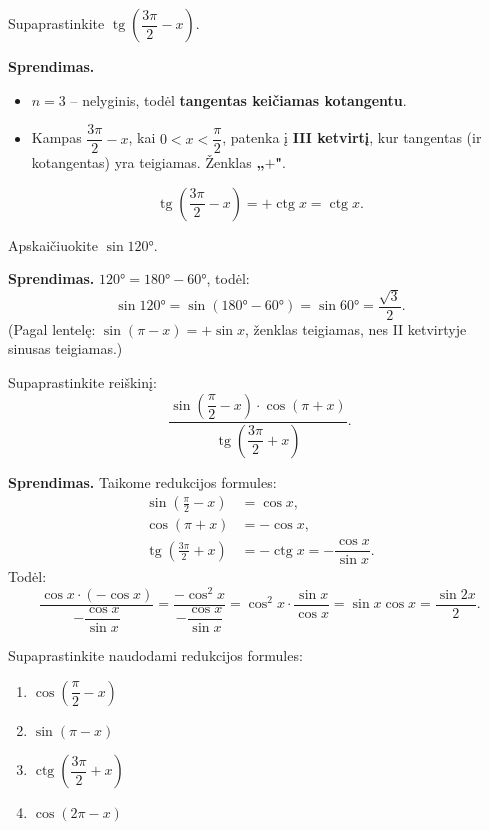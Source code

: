 \begin{example}
  Supaprastinkite $\operatorname{tg}\!\left(\dfrac{3\pi}{2} - x\right)$.

  \textbf{Sprendimas.}
  \begin{itemize}
    \item $n = 3$ -- nelyginis, todėl \textbf{tangentas keičiamas kotangentu}.
    \item Kampas $\dfrac{3\pi}{2} - x$, kai $0<x<\dfrac{\pi}{2}$, patenka į
          \textbf{III ketvirtį}, kur tangentas (ir kotangentas) yra teigiamas.
          Ženklas \textbf{„$+$"}.
  \end{itemize}
  \[
    \operatorname{tg}\!\left(\frac{3\pi}{2}-x\right) = +\operatorname{ctg} x
    = \operatorname{ctg} x.
  \]
\end{example}

\begin{example}
  Apskaičiuokite $\sin 120°$.

  \textbf{Sprendimas.} $120° = 180° - 60°$, todėl:
  \[
    \sin 120° = \sin(180°-60°) = \sin 60° = \frac{\sqrt{3}}{2}.
  \]
  (Pagal lentelę: $\sin(\pi - x) = +\sin x$, ženklas teigiamas, nes II
  ketvirtyje sinusas teigiamas.)
\end{example}

\begin{example}
  Supaprastinkite reiškinį:
  \[
    \frac{\sin\!\left(\dfrac{\pi}{2}-x\right)
          \cdot\cos(\pi+x)}
         {\operatorname{tg}\!\left(\dfrac{3\pi}{2}+x\right)}.
  \]

  \textbf{Sprendimas.} Taikome redukcijos formules:
  \begin{align*}
    \sin\!\left(\tfrac{\pi}{2}-x\right) &= \cos x, \\
    \cos(\pi+x) &= -\cos x, \\
    \operatorname{tg}\!\left(\tfrac{3\pi}{2}+x\right)
      &= -\operatorname{ctg} x = -\dfrac{\cos x}{\sin x}.
  \end{align*}
  Todėl:
  \[
    \frac{\cos x \cdot(-\cos x)}{-\dfrac{\cos x}{\sin x}}
    = \frac{-\cos^2\!x}{-\dfrac{\cos x}{\sin x}}
    = \cos^2\!x \cdot \frac{\sin x}{\cos x}
    = \sin x\cos x
    = \frac{\sin 2x}{2}.
  \]
\end{example}

\begin{exercise}
  Supaprastinkite naudodami redukcijos formules:
  \begin{enumerate}[label=\alph*)]
    \item $\cos\!\left(\dfrac{\pi}{2}-x\right)$
    \item $\sin(\pi - x)$
    \item $\operatorname{ctg}\!\left(\dfrac{3\pi}{2}+x\right)$
    \item $\cos(2\pi - x)$
  \end{enumerate}
\end{exercise}

